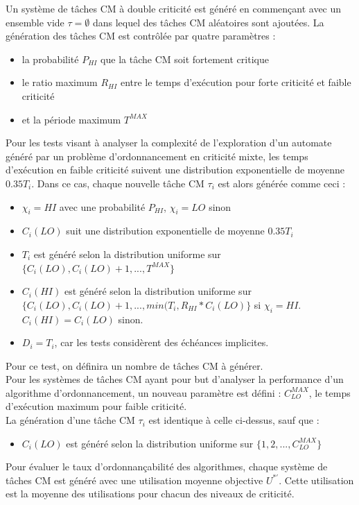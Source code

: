 \documentclass[12pt,a4paper,oneside]{book}
\theoremstyle{break}
\theoremstyle{breakplain}
\begin{document}
Un système de tâches CM à double criticité est généré en commençant avec un ensemble vide $\tau = \emptyset$ dans lequel des tâches CM aléatoires sont ajoutées. La génération des tâches CM est contrôlée par quatre paramètres :
\begin{itemize}
\item la probabilité $P_{HI}$ que la tâche CM soit fortement critique
\item le ratio maximum $R_{HI}$ entre le temps d'exécution pour forte criticité et faible criticité
\item et la période maximum $T^{MAX}$
\end{itemize}
Pour les tests visant à analyser la complexité de l'exploration d'un automate généré par un problème d'ordonnancement en criticité mixte, les temps d'exécution en faible criticité suivent une distribution exponentielle de moyenne $0.35 T_i$. Dans ce cas, chaque nouvelle tâche CM $\tau_i$ est alors générée comme ceci :
\begin{itemize}
\item $\chi_i = HI$ avec une probabilité $P_{HI}$, $\chi_i = LO$ sinon
\item $C_i(LO)$ suit une distribution exponentielle de moyenne $0.35 T_i$
\item $T_i$ est généré selon la distribution uniforme sur $\{C_i(LO),C_i(LO)+1,...,T^{MAX}\}$
\item $C_i(HI)$ est généré selon la distribution uniforme sur\\$\{C_i(LO),C_i(LO)+1,..., min(T_i ,R_{HI}*C_i(LO)\}$ si $\chi_i = HI$. $C_i(HI) = C_i(LO)$ sinon.
\item $D_i = T_i$, car les tests considèrent des échéances implicites.
\end{itemize}

Pour ce test, on définira un nombre de tâches CM à générer.\\

Pour les systèmes de tâches CM ayant pour but d'analyser la performance d'un algorithme d'ordonnancement, un nouveau paramètre est défini : $C^{MAX}_{LO}$, le temps d'exécution maximum pour faible criticité.\\
La génération d'une tâche CM $\tau_i$ est identique à celle ci-dessus, sauf que :
\begin{itemize}
\item $C_i(LO)$ est généré selon la distribution uniforme sur $\{1,2,...,C^{MAX}_{LO}\}$
\end{itemize}
Pour évaluer le taux d'ordonnançabilité des algorithmes, chaque système de tâches CM est généré avec une utilisation moyenne objective $U^{*'}$. Cette utilisation est la moyenne des utilisations pour chacun des niveaux de criticité.\\
\end{document}
